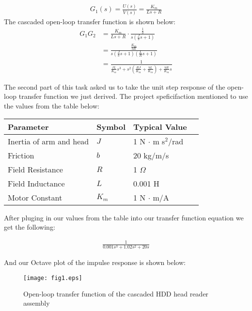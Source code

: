 \documentclass{article}
\begin{document}
	\begin{align*}
		G_1(s) = \frac{U(s)}{V(s)} = \frac{K_m}{Ls + R} 
	\end{align*}
	The cascaded open-loop transfer function is shown below:
	\begin{align*}
		G_1G_2 &= \frac{K_m}{Ls+R} \cdot \frac{\frac{1}{b}}{s(\frac{J}{b}s + 1)} \\
			   &= \frac{\frac{K_m}{bR}}{s\left(\frac{J}{b}s + 1\right)
			   \left(\frac{L}{R}s + 1\right)} \\
			   &= \frac{1}{\frac{JL}{K_m}s^3 + s^2\left( \frac{RJ}{K_m} + 
			   \frac{bL}{K_m} \right) + \frac{bR}{K_m}s}
	\end{align*}

	The second part of this task asked us to take the unit step response of the 
	open-loop transfer function we just derived. The project speficifaction 
	mentioned to use the values from the table below:\\

	\begin{center}
    \begin{tabular}{ | l | l | l | p{5cm} |}
    \hline
    Parameter & Symbol & Typical Value \\ \hline
    Inertia of arm and head & $J$ & 1 N $\cdot$ m s$^2$/rad \\ \hline 
    Friction & $b$ & 20 kg/m/s \\ \hline
    Field Resistance & $R$ & 1 $\Omega$ \\ \hline
	Field Inductance & $L$ & 0.001 H \\ \hline
	Motor Constant & $K_m$ & 1 N $\cdot$ m/A \\
    \hline
    \end{tabular}
	\end{center}

	After pluging in our values from the table into our transfer function 
	equation we get the following:

	\begin{align*}
		\frac{1}{0.001s^3 + 1.02 s^2 + 20s} 
	\end{align*}

	And our Octave plot of the impulse response is shown below: \\

	\begin{figure}[h!]
		\caption{Open-loop transfer function of the cascaded HDD head reader
		assembly}
		\centering
		\texttt{[image: fig1.eps]}
	\end{figure}
\end{document}
